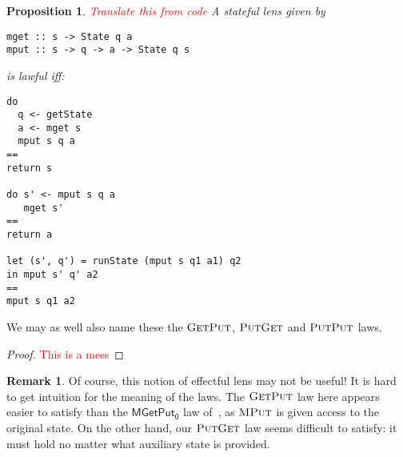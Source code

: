 \documentclass[11pt,letterpaper]{article}
\theoremstyle{plain}
\newtheorem{proposition}[theorem]{Proposition}
\theoremstyle{definition}
\newtheorem{remark}[theorem]{Remark}
\newcommand{\C}{\mathscr{C}}
\newcommand{\homC}{\underline{\C}}
\newcommand{\fget}{\textsc{Get}}
\newcommand{\fput}{\textsc{Put}}
\newcommand{\mput}{\textsc{MPut}}
\newcommand{\todo}[1]{\textcolor{red}{\small #1}}
\begin{document}
\begin{proposition}
\todo{Translate this from code}
A stateful lens given by
\begin{verbatim}
mget :: s -> State q a
mput :: s -> q -> a -> State q s
\end{verbatim}
is lawful iff:
\begin{verbatim}
do
  q <- getState
  a <- mget s
  mput s q a
==
return s

do s' <- mput s q a
   mget s'
==
return a

let (s', q') = runState (mput s q1 a1) q2
in mput s' q' a2
==
mput s q1 a2
\end{verbatim}
\end{proposition}
We may as well also name these the $\fget\fput$, $\fput\fget$ and $\fput\fput$ laws.
\begin{proof}
\todo{This is a mess}
\end{proof}

\begin{remark}
Of course, this notion of effectful lens may not be useful! It is hard to get intuition for the meaning of the laws. The $\fget\fput$ law here appears easier to satisfy than the $\mathsf{MGetPut_0}$ law of~\cite{ReflectionsOnMonadicLenses}, as $\mput$ is given access to the original state. On the other hand, our $\fput\fget$ law seems difficult to satisfy: it must hold no matter what auxiliary state is provided.
\end{remark}
\end{document}
